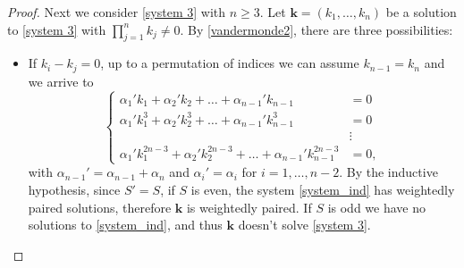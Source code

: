 \documentclass[a4paper,10pt,reqno]{article}
\theoremstyle{definition}
\theoremstyle{plain}
\theoremstyle{plain}
\theoremstyle{definition}
\theoremstyle{plain}
\theoremstyle{plain}
\theoremstyle{plain}
\theoremstyle{definition}
\theoremstyle{definition}
\def \k{\bm{k}}
\begin{document}
\begin{proof}


\medskip

 Next we consider \eqref{system 3} with $n\geq 3$.
Let $\k = (k_1,\ldots,k_n)$ be a solution to \eqref{system 3} with $\prod_{j=1}^n k_j \neq 0$.
By \eqref{vandermonde2}, there are three possibilities:

\begin{itemize}
\item If $k_i-k_j=0$, up to a permutation of indices we can assume $k_{n-1}=k_n$ and we arrive to 
\begin{equation}\label{system_ind}
\begin{cases}
\alpha_1' k_1 + \alpha_2' k_2+\ldots+ \alpha_{n-1}' k_{n-1} & = 0 \\
\alpha_1' k_1^3 + \alpha_2' k_2^3 + \ldots+ \alpha_{n-1}' k_{n-1}^3 & = 0 \\
& \vdots \\
\alpha_1' k_1^{2n-3} + \alpha_2' k_2^{2n-3} +\ldots + \alpha_{n-1}' k_{n-1}^{2n-3} & =0,
\end{cases}
\end{equation}
with $\alpha_{n-1}' = \alpha_{n-1}+\alpha_{n}$ and $\alpha_i' = \alpha_i$ for $i=1,\ldots,n-2$. 
By the inductive hypothesis, since $S'=S$, if $S$ is even, the system \eqref{system_ind} has weightedly paired solutions, therefore $\k$ is weightedly paired. If $S$ is odd we have no solutions to \eqref{system_ind}, and thus $\k$ doesn't solve \eqref{system 3}. 


\end{itemize}
\end{proof}
\end{document}
